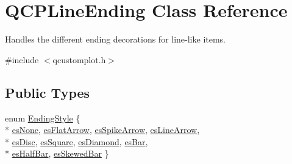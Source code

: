 \hypertarget{classQCPLineEnding}{}\section{Q\+C\+P\+Line\+Ending Class Reference}
\label{classQCPLineEnding}


Handles the different ending decorations for line-\/like items.  




{\ttfamily \#include $<$qcustomplot.\+h$>$}

\subsection*{Public Types}
\begin{DoxyCompactItemize}
\item 
enum \hyperlink{classQCPLineEnding_a5ef16e6876b4b74959c7261d8d4c2cd5}{Ending\+Style} \{ \\*
\hyperlink{classQCPLineEnding_a5ef16e6876b4b74959c7261d8d4c2cd5aca12d500f50cd6871766801bac30fb03}{es\+None}, 
\hyperlink{classQCPLineEnding_a5ef16e6876b4b74959c7261d8d4c2cd5a3d7dcea2f100671727c3417142154f8f}{es\+Flat\+Arrow}, 
\hyperlink{classQCPLineEnding_a5ef16e6876b4b74959c7261d8d4c2cd5ab9964d0d03f812d1e79de15edbeb2cbf}{es\+Spike\+Arrow}, 
\hyperlink{classQCPLineEnding_a5ef16e6876b4b74959c7261d8d4c2cd5a61f78ee8f375fb21cb9d250687bbcbd2}{es\+Line\+Arrow}, 
\\*
\hyperlink{classQCPLineEnding_a5ef16e6876b4b74959c7261d8d4c2cd5ae5a3414916817258bcc6dddd605e8f5c}{es\+Disc}, 
\hyperlink{classQCPLineEnding_a5ef16e6876b4b74959c7261d8d4c2cd5ae1836502fa43d8990bb62b2d493a140a}{es\+Square}, 
\hyperlink{classQCPLineEnding_a5ef16e6876b4b74959c7261d8d4c2cd5a378fe5a8b768411b0bc1765210fe7200}{es\+Diamond}, 
\hyperlink{classQCPLineEnding_a5ef16e6876b4b74959c7261d8d4c2cd5a2cf543bbca332df26d89bf779f50469f}{es\+Bar}, 
\\*
\hyperlink{classQCPLineEnding_a5ef16e6876b4b74959c7261d8d4c2cd5a126c390f0c359fcd8df1fc5e38d26d5b}{es\+Half\+Bar}, 
\hyperlink{classQCPLineEnding_a5ef16e6876b4b74959c7261d8d4c2cd5a2b2cc96e757ca9bcd91fb70221ed43ab}{es\+Skewed\+Bar}
 \}
\end{DoxyCompactItemize}
